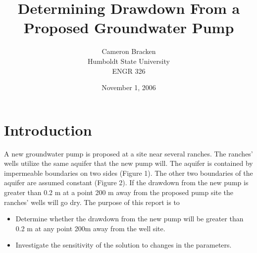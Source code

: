 \documentclass[titlepage,11pt]{article}
\begin{document}
\onehalfspacing

\begin{singlespacing}
\title{Determining Drawdown From a Proposed Groundwater Pump}
\author{Cameron Bracken\\Humboldt State University\\ENGR 326}
\date{November 1, 2006}
\maketitle
{}\pagestyle{myheadings}
\tableofcontents{}
\listoffigures {}
\listoftables
\newpage
\end{singlespacing}
\pagestyle{headings}

\section {Introduction}
A new groundwater pump is proposed at a site near several ranches.
The ranches' wells utilize the same aquifer that the new pump will.
The aquifer is contained by impermeable boundaries on two sides
(Figure 1). The other two boundaries of the aquifer are assumed
constant (Figure 2). If the drawdown from the new pump is greater
than 0.2 m at a point 200 m away from the proposed pump site the
ranches' wells will go dry. The purpose of this report is to
\begin{itemize}
\item{Determine whether the drawdown from the new pump will be greater than 0.2 m at any point 200m away from the well site.}
\item{Investigate the sensitivity of the solution to changes in the parameters.}
\end{itemize}
\end{document}
